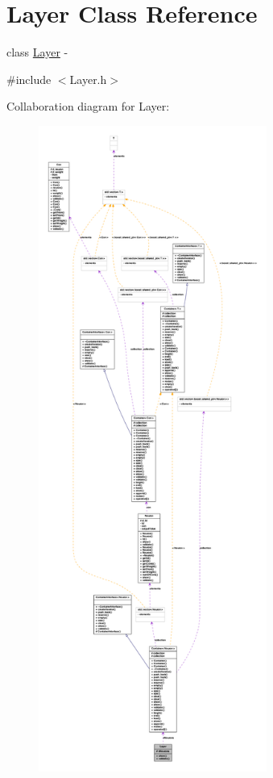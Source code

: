\hypertarget{class_layer}{
\section{Layer Class Reference}
\label{class_layer}
}


class \hyperlink{class_layer}{Layer} -\/  




{\ttfamily \#include $<$Layer.h$>$}



Collaboration diagram for Layer:
\nopagebreak
\begin{figure}[H]
\begin{center}
\leavevmode
\includegraphics[height=600pt]{class_layer__coll__graph}
\end{center}
\end{figure}
